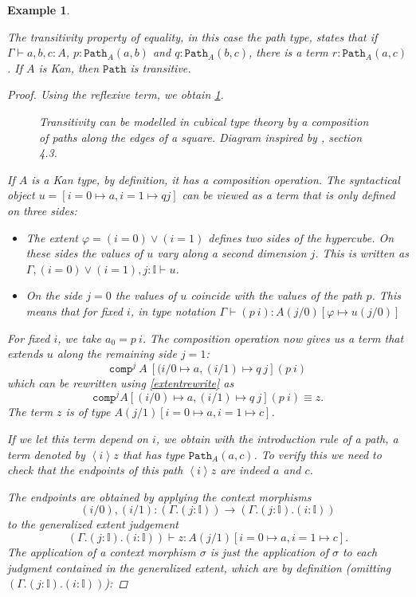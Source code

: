 \documentclass[12pt,a4paper,twoside,xetex,draft]{book}
\newcommand{\keyword}[1]{\emph{#1}\index{#1}}
\newtheorem{example}[theorem]{Example}
\newcommand{\op}[1]{\mathtt{#1}}
\newcommand{\pa}[3]{\op{Path}_{#1}\left(#2, #3\right)}
\begin{document}
\begin{example}\label{pathtransitivity}

The \keyword{transitivity} property of equality, in this case the path type, states that if $\Gamma \vdash a,b,c : A$, $p: \op{Path}_A(a,b)$ and $q: \op{Path}_A(b,c)$, there is a term $r : \op{Path}_A(a,c)$. If $A$ is Kan, then $\op{Path}$ is transitive.	

\begin{proof}
Using the reflexive term, we obtain \cref{transdiag}.

\begin{figure}\label{transdiag}

\caption{Transitivity can be modelled in cubical type theory by a  composition of paths along the edges of a square. Diagram inspired by \cite{Cohen2016}, section 4.3.}
\end{figure}

If $A$ is a Kan type, by definition, it has a composition operation. The syntactical object $u = [i=0 \mapsto a, i=1 \mapsto q j]$ can be viewed as a term that is only defined on three sides:

\begin{itemize}
\item The extent $\varphi = (i=0) \vee (i=1)$ defines two sides of the hypercube. On these sides the values of $u$ vary along a second dimension $j$. This is written as $\Gamma, (i=0)\vee (i=1), j : \mathbb{I} \vdash u$.
\item On the side $j=0$ the values of $u$ coincide with the values of the path $p$. This means that for fixed $i$, in type notation $\Gamma \vdash (p \  i) : A(j/0)[\varphi \mapsto u(j/0)]$

\end{itemize}

For fixed $i$, we take $a_0 = p \  i$. The composition operation now gives us a term that extends $u$ along the remaining side $j=1$: $$\op{comp}^j\ A\ [(i/0 \mapsto a, (i/1) \mapsto q\ j] (p\ i)$$ which can be rewritten using  \cref{extentrewrite} as $$\op{comp}^j A [(i/0) \mapsto a, (i/1) \mapsto q \ j] (p \  i) \equiv z.$$ The term $z$ is of type $A(j/1)[i=0 \mapsto a, i=1 \mapsto c]$.

If we let this term depend on $i$, we obtain with the introduction rule of a path, a term denoted by $\left< i \right> z$ that has type $\pa{A}{a}{c}$. To verify this we need to check that the endpoints of this path $\left< i \right> z$ are indeed $a$ and $c$.

The endpoints are obtained by applying the context morphisms $$(i/0),(i/1): (\Gamma . ( j : \mathbb{I})) \rightarrow (\Gamma. ( j : \mathbb{I}) . ( i :  \mathbb{I}))$$ to the generalized extent judgement $$(\Gamma. ( j : \mathbb{I}) . ( i :  \mathbb{I})) \vdash z : A(j/1) [i =0 \mapsto a, i=1 \mapsto c].$$ The application of a context morphism $\sigma$  is just the application of $\sigma$ to each judgment contained in the generalized extent, which are by definition (omitting $(\Gamma. ( j : \mathbb{I}) . ( i :  \mathbb{I}))$):


\end{proof}
\end{example}
\end{document}
